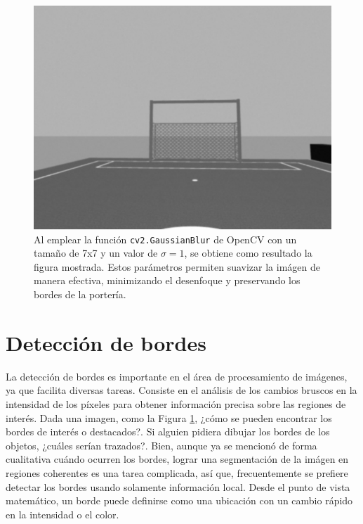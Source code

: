 \begin{figure}[H]
\begin{minipage}[b]{0.5\linewidth}
		\includegraphics[width=\linewidth]{images/gaussianfilter.jpg}
	\end{minipage}%
	\hspace{1em}
	\begin{minipage}[b]{0.4\linewidth}
		\caption{Al emplear la función \texttt{cv2.GaussianBlur} de OpenCV con un tamaño de 7x7 y un valor de $\sigma=1$, se obtiene como resultado la figura mostrada. Estos parámetros permiten suavizar la imágen de manera efectiva, minimizando el desenfoque y preservando los bordes de la portería.}
	
	\end{minipage}
	\label{fig:sigma}
\end{figure}









\section{Detección de bordes}
La detección de bordes es importante en el área de procesamiento de imágenes, ya que facilita diversas tareas. Consiste en el análisis de los cambios bruscos en la intensidad de los píxeles para obtener información precisa sobre las regiones de interés.\cite{rebaza2007deteccion} Dada una imagen, como la Figura \ref{fig:sigma}, ¿cómo se pueden encontrar los bordes de interés o destacados?. Si alguien pidiera dibujar los bordes de los objetos, ¿cuáles serían trazados?. Bien, aunque ya se mencionó de forma cualitativa cuándo ocurren los bordes, lograr una segmentación de la imágen en regiones coherentes es una tarea complicada, así que, frecuentemente se prefiere detectar los bordes usando solamente información local.\cite{szeliski2022computer}
Desde el punto de vista matemático, un borde puede definirse como una ubicación con un cambio rápido en la intensidad o el color.
\\
